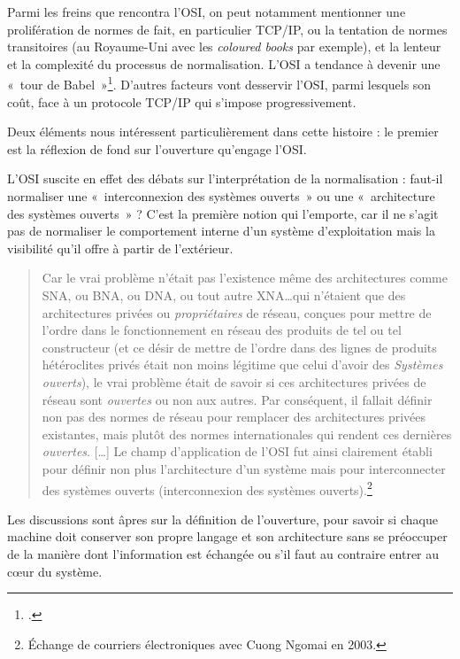 \documentclass{FramateX}
\begin{document}
\begin{refsection}
Parmi les freins que rencontra l'OSI, on peut notamment
mentionner une prolifération de normes de fait, en particulier TCP/IP,
ou la tentation de normes transitoires (au Royaume-Uni avec les
\textit{coloured books} par exemple), et la lenteur et la
complexité du processus de normalisation. L'OSI a
tendance à devenir une «~tour de Babel~»\footnote{\cite[p.~151]{abbateinventing1999}.}. D'autres facteurs vont
desservir l'OSI, parmi lesquels son coût, face à un
protocole TCP/IP qui s'impose progressivement. 

Deux éléments nous intéressent particulièrement dans cette histoire : le
premier est la réflexion de fond sur l'ouverture
qu'engage l'OSI. 

L'OSI suscite en effet des débats sur
l'interprétation de la normalisation : faut-il
normaliser une «~interconnexion des systèmes ouverts~» ou une
«~architecture des systèmes ouverts~» ? C'est la
première notion qui l'emporte, car il ne
s'agit pas de normaliser le comportement interne
d'un système d'exploitation mais la
visibilité qu'il offre à partir de
l'extérieur. 

\begin{quote}
Car le vrai problème n'était pas
l'existence même des architectures comme SNA, ou BNA,
ou DNA, ou tout autre XNA\ldots qui n'étaient que des
architectures privées ou
\textit{propriétaires} de réseau, conçues
pour mettre de l'ordre dans le fonctionnement en
réseau des produits de tel ou tel constructeur (et ce désir de mettre
de l'ordre dans des lignes de produits hétéroclites
privés était non moins légitime que celui d'avoir des
\textit{Systèmes ouverts}), le vrai problème
était de savoir si ces architectures privées de réseau sont
\textit{ouvertes} ou non aux autres. Par
conséquent, il fallait définir non pas des normes de réseau pour
remplacer des architectures privées existantes, mais plutôt des normes
internationales qui rendent ces dernières \textit{ouvertes}. [\ldots] Le
champ d'application de l'OSI fut
ainsi clairement établi pour définir non plus
l'architecture d'un système mais pour
interconnecter des systèmes ouverts (interconnexion des systèmes
ouverts).\footnote{Échange de courriers électroniques avec Cuong Ngomai en 2003.}
\end{quote}

Les discussions sont âpres sur la définition de
l'ouverture, pour savoir si chaque machine doit
conserver son propre langage et son architecture sans se préoccuper de
la manière dont l'information est échangée ou
s'il faut au contraire entrer au cœur du système.


\end{refsection}
\end{document}
